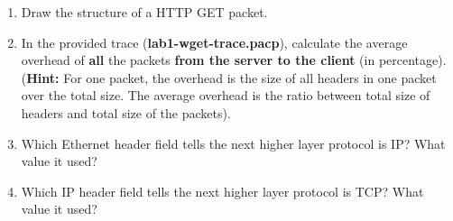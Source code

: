 \begin{enumerate}

\item Draw the structure of a HTTP GET packet.

\item In the provided trace ({\bf lab1-wget-trace.pacp}), calculate the average overhead of \textbf{all} the packets \textbf{from the server to the client} (in percentage). ({\bf Hint:} For one packet, the overhead is the size of all headers in one packet over the total size. The average overhead is the ratio between total size of headers and total size of the packets).

\item Which Ethernet header field tells the next higher layer protocol is IP? What value it used?

\item Which IP header field tells the next higher layer protocol is TCP? What value it used?
\end{enumerate}


